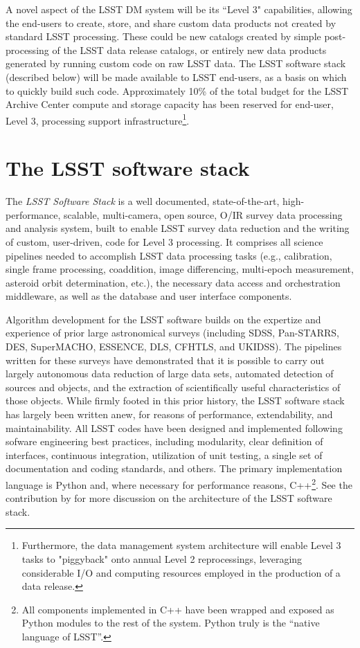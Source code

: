 \documentclass[11pt,twoside]{article}
\begin{document}
A novel aspect of the LSST DM system will be its ``Level 3"
capabilities, allowing the end-users to create, store, and share
custom data products not created by standard LSST processing. These
could be new catalogs created by simple post-processing of the LSST
data release catalogs, or entirely new data products generated by
running custom code on raw LSST data. The LSST software stack (described
below) will be made available to LSST end-users, as a basis on which
to quickly build such code. Approximately 10\% of the total
budget for the LSST Archive Center compute and storage capacity has
been reserved for end-user, Level 3, processing support
infrastructure\footnote{Furthermore, the data management system 
architecture will enable Level 3 tasks to "piggyback" onto annual 
Level 2 reprocessings, leveraging considerable I/O and
computing resources employed in the production of a data release.}. 

\section{The LSST software stack}
\label{sec:dmstack}

The {\em LSST Software Stack} is a well documented, state-of-the-art,
high-performance, scalable, multi-camera, open source, O/IR survey
data processing and analysis system, built to enable LSST survey data
reduction and the writing of custom, user-driven, code for Level 3
processing. It comprises 
all science pipelines needed to accomplish LSST data processing tasks
(e.g., calibration, single frame processing, coaddition, image
differencing, multi-epoch measurement, asteroid orbit determination,
etc.), the necessary data 
access and orchestration middleware, as well as the database and user
interface components. 

Algorithm development for the LSST software builds on the expertize
and experience of prior large astronomical surveys (including SDSS,
Pan-STARRS, DES,  
SuperMACHO, ESSENCE,  DLS, CFHTLS, and UKIDSS). The pipelines written 
for these surveys have demonstrated that it is possible to carry out
largely autonomous data 
reduction of large data sets, automated detection of sources and
objects, and the  
extraction of scientifically useful characteristics of those objects. 
While firmly footed in this prior history, the LSST software stack has 
largely been written anew, for reasons of performance, extendability, and
maintainability. All LSST codes have been designed and implemented 
following sofware engineering best practices, including modularity, clear definition
of interfaces, continuous integration, 
utilization of unit testing, a single set of documentation and coding
standards, and others. The primary implementation language is Python and, where
necessary for performance reasons, C++\footnote{All components implemented 
in C++ have been wrapped and exposed as Python modules to the rest 
of the system. Python truly is the ``native language of LSST''.}.
See the contribution by \citet{P056_adassxxv} for more discussion on the 
architecture of the LSST software stack.
\end{document}
